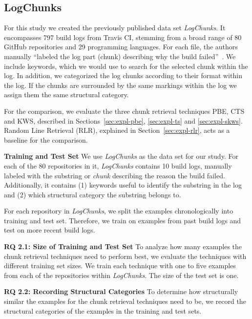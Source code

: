 \subsection{LogChunks}
For this study we created the previously published data set \emph{LogChunks}.
It encompasses 797 build logs from Travis CI, stemming from a broad range of 80
GitHub repositories and 29 programming languages. For each file, the authors
manually ``labeled the log part (chunk) describing why the build failed''~\cite{brandt2020logchunks}.
We include keywords, which we would use to search for the selected chunk
within the log. In addition, we categorized the log chunks according to their
format within the log. If the chunks are surrounded by the same markings within
the log we assign them the same structural category.

For the comparison, we evaluate the three chunk retrieval techniques PBE, CTS and KWS, described in Sections~\ref{sec:expl-pbe}, \ref{sec:expl-ts} and \ref{sec:expl-skws}.
Random Line Retrieval (RLR), explained in Section~\ref{sec:expl-rlr}, acts as a baseline for the comparison.

\noindent
\textbf{Training and Test Set}
We use \emph{LogChunks} as the data set for our study.
For each of the 80 repositories in it, \emph{LogChunks} contains 10 build logs, manually labeled with the substring or \emph{chunk} describing the reason the build failed.
Additionally, it contains (1) keywords useful to
identify the substring in the log  and (2) which structural category the substring belongs to.

For each repository in \emph{LogChunks}, we split the examples chronologically into training and test set.
Therefore, we train on examples from past build logs and test on more recent build logs.

\noindent
\textbf{RQ 2.1: Size of Training and Test Set}
To analyze how many examples the chunk retrieval techniques need to perform best, we evaluate the techniques with different training set sizes.
We train each technique with one to five examples from each of the repositories within \emph{LogChunks}.
The size of the test set is one.

\noindent
\textbf{RQ 2.2: Recording Structural Categories}
To determine how structurally similar the examples for the chunk retrieval techniques need to be, we record the structural categories of the examples in the training and test sets.

